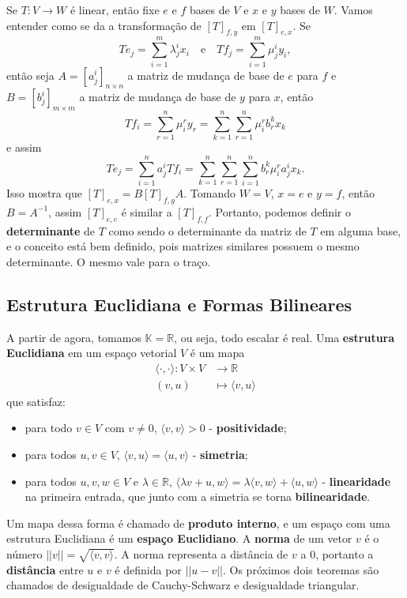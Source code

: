 \documentclass{article}
\begin{document}
Se $T \colon V \to W$ é linear, então fixe $e$ e $f$ bases de $V$ e $x$ e $y$ bases de $W$. Vamos entender como se da a transformação de $[T]_{f,y}$ em $[T]_{e,x}$. Se \begin{equation}
    Te_j = \sum_{i = 1}^m \lambda^i_j x_i \quad \text{e} \quad Tf_j = \sum_{i = 1}^m \mu^i_j y_i,
\end{equation} então seja $A = [a^i_j]_{n \times n}$ a matriz de mudança de base de $e$ para $f$ e $B = [b^i_j]_{m \times m}$ a matriz de mudança de base de $y$ para $x$, então \begin{equation}
    Tf_i = \sum_{r = 1}^n \mu^r_i y_r = \sum_{k = 1}^n \sum_{r = 1}^n \mu^r_i b^k_r x_k
\end{equation} e assim \begin{equation}
    Te_j = \sum_{i = 1}^n a^i_j Tf_i = \sum_{k = 1}^n \sum_{r = 1}^n \sum_{i = 1}^n b^k_r \mu^r_i a^i_j x_k.
\end{equation} Isso mostra que $[T]_{e,x} = B[T]_{f,y}A$. Tomando $W = V$, $x = e$ e $y = f$, então $B = A^{-1}$, assim $[T]_{e,e}$ é similar a $[T]_{f,f}$. Portanto, podemos definir o \textbf{determinante} de $T$ como sendo o determinante da matriz de $T$ em alguma base, e o conceito está bem definido, pois matrizes similares possuem o mesmo determinante. O mesmo vale para o traço.

\subsection{Estrutura Euclidiana e Formas Bilineares}

A partir de agora, tomamos $\mathbb{K} = \mathbb{R}$, ou seja, todo escalar é real. Uma \textbf{estrutura Euclidiana} em um espaço vetorial $V$ é um mapa \begin{equation}
    \begin{split}
        \langle \cdot, \cdot \rangle \colon V \times V &\to \mathbb{R} \\ (v,u) &\mapsto \langle v, u \rangle
    \end{split}
\end{equation} que satisfaz: \begin{itemize}
    \item para todo $v \in V$ com $v \neq 0$, $\langle v, v \rangle > 0$ - \textbf{positividade};
    \item para todos $u, v \in V$, $\langle v, u \rangle = \langle u, v \rangle$ - \textbf{simetria};
    \item para todos $u, v, w \in V$ e $\lambda \in \mathbb{R}$, $\langle \lambda v + u, w \rangle = \lambda \langle v, w \rangle + \langle u, w \rangle$ - \textbf{linearidade} na primeira entrada, que junto com a simetria se torna \textbf{bilinearidade}.
\end{itemize}
Um mapa dessa forma é chamado de \textbf{produto interno}, e um espaço com uma estrutura Euclidiana é um \textbf{espaço Euclidiano}. A \textbf{norma} de um vetor $v$ é o número $||v|| = \sqrt{\langle v, v \rangle}$. A norma representa a distância de $v$ a $0$, portanto a \textbf{distância} entre $u$ e $v$ é definida por $||u - v||$. Os próximos dois teoremas são chamados de desigualdade de Cauchy-Schwarz e desigualdade triangular.
\end{document}
